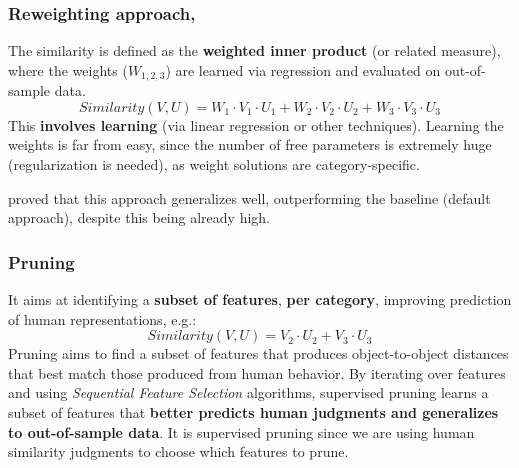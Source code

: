 \subsubsection{Reweighting approach, \cite{peterson}}
The similarity is defined as the \textbf{weighted inner product} (or related measure), where the weights ($W_{1,2,3}$) are learned via regression and evaluated on out-of-sample data.
\[
    Similarity(V,U) = W_1 \cdot V_1 \cdot U_1 + W_2 \cdot V_2 \cdot U_2 + W_3 \cdot V_3 \cdot U_3
\]
This \textbf{involves learning} (via linear regression or other techniques). Learning the weights is far from easy, since the number of free parameters is extremely huge (regularization is needed), as weight solutions are category-specific.

\cite{peterson} proved that this approach generalizes well, outperforming the baseline (default approach), despite this being already high.

\subsubsection{Pruning}
It aims at identifying a \textbf{subset of features}, \textbf{per category}, improving prediction of human representations, e.g.:
\[
    Similarity(V,U) = V_2 \cdot U_2 + V_3 \cdot U_3
\]
Pruning aims to find a subset of features that produces object-to-object distances that best match those produced from human behavior. By iterating over features and using \textit{Sequential Feature Selection} algorithms, supervised pruning learns a subset of features that \textbf{better predicts human judgments and generalizes to out-of-sample data}. It is supervised pruning since we are using human similarity judgments to choose which features to prune.


